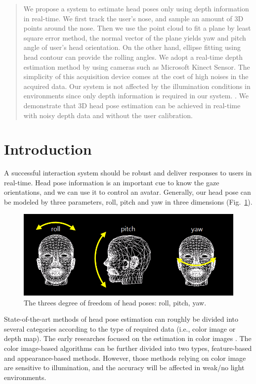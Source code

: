 \begin{abstract}
We propose a system to estimate head poses only using depth information in real-time. We first track the user’s nose, and sample an amount of 3D points around the nose. Then we use the point cloud to fit a plane by least square error method, the normal vector of the plane yields yaw and pitch angle of user’s head orientation. On the other hand, ellipse fitting using head contour can provide the rolling angles. We adopt a real-time depth estimation method by using cameras such as Microsoft Kinect Sensor. The simplicity of this acquisition device comes at the cost of high noises in the acquired data. Our system is not affected by the illumination conditions in environments since only depth information is required in our system. . We demonstrate that 3D head pose estimation can be achieved in real-time with noisy depth data and without the user calibration.
\end{abstract}

\section{Introduction}
\label{sec:1}
A successful interaction system should be robust and deliver responses to users in real-time. Head pose information is an important cue to know the gaze orientations, and we can use it to control an avatar. Generally, our head pose can be modeled by three parameters, roll, pitch and yaw in three dimensions (Fig.~\ref{fig:1}).
\begin{figure}
\includegraphics[width=1.0\linewidth]{./fig1.png}
\caption{The threes degree of freedom of head poses: roll, pitch, yaw.}
\label{fig:1}       %
\end{figure}
State-of-the-art methods of head pose estimation can roughly be divided into several categories according to the type of required data (i.e., color image or depth map). The early researches focused on the estimation in color images \cite{Ref15}. The color image-based algorithms can be further divided into two types, feature-based \cite{Ref1,Ref8,Ref10,Ref11,Ref18} and appearance-based \cite{Ref2,Ref4,Ref5,Ref6,Ref7,Ref17} methods. However, those methods relying on color image are sensitive to illumination, and the accuracy will be affected in weak/no light environments.

